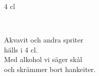 \begin{song}{4 cl}
	
	
	\\
	
	Akvavit och andra spriter\\
	hälls i 4 cl.\\
	Med alkohol vi säger skål\\
	och skrämmer bort hankeiter.
	
\end{song}
